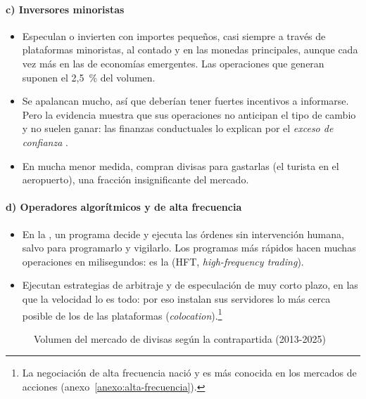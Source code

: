 \documentclass[11pt]{article}
\begin{document}
\paragraph{c) Inversores minoristas}

\begin{itemize}
\item Especulan o invierten con importes pequeños, casi siempre a través de plataformas minoristas, al contado y en las monedas principales, aunque cada vez más en las de economías emergentes. Las operaciones que generan suponen el 2,5~\% del volumen\nocite{BIS2026TrienalDatos}.
\item Se apalancan mucho, así que deberían tener fuertes incentivos a informarse. Pero la evidencia muestra que sus operaciones no anticipan el tipo de cambio y no suelen ganar: las finanzas conductuales lo explican por el \emph{exceso de confianza}  .
\item En mucha menor medida, compran divisas para gastarlas (el turista en el aeropuerto), una fracción insignificante del mercado.
\end{itemize}

\paragraph{d) Operadores algorítmicos y de alta frecuencia}

\begin{itemize}
\item En la , un programa decide y ejecuta las órdenes sin intervención humana, salvo para programarlo y vigilarlo. Los programas más rápidos hacen muchas operaciones en milisegundos: es la  (HFT, \emph{high-frequency trading}).
\item Ejecutan estrategias de arbitraje y de especulación de muy corto plazo, en las que la velocidad lo es todo: por eso instalan sus servidores lo más cerca posible de los de las plataformas (\emph{colocation}).\footnote{La negociación de alta frecuencia nació y es más conocida en los mercados de acciones (anexo~\ref{anexo:alta-frecuencia}).}
\end{itemize}

\begin{figure}[H]
\centering
\caption{Volumen del mercado de divisas según la contrapartida (2013-2025)}\label{fig:contrapartidas-bis}
\end{figure}
\end{document}
